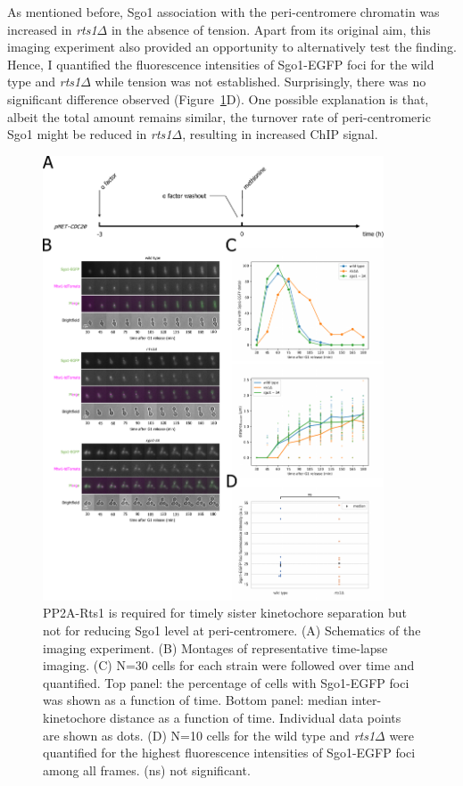 As mentioned before, Sgo1 association with the peri-centromere chromatin was increased in \textit{rts1$\Delta$} in the absence of tension. Apart from its original aim, this imaging experiment also provided an opportunity to alternatively test the finding. Hence, I quantified the fluorescence intensities of Sgo1-EGFP foci for the wild type and \textit{rts1$\Delta$} while tension was not established. Surprisingly, there was no significant difference observed (Figure~\ref{fig:sgo1rts1mutants}D). One possible explanation is that, albeit the total amount remains similar, the turnover rate of peri-centromeric Sgo1 might be reduced in \textit{rts1$\Delta$}, resulting in increased ChIP signal. 

\begin{figure}[htbp]
  \centering
  \includegraphics[width=0.9\textwidth]{chapter3/figures/Sgo1 rts1 mutants.pdf}
  \caption[PP2A-Rts1 is required for timely sister kinetochore separation but not for reducing Sgo1 level at peri-centromere]{PP2A-Rts1 is required for timely sister kinetochore separation but not for reducing Sgo1 level at peri-centromere. (A) Schematics of the imaging experiment. (B) Montages of representative time-lapse imaging. (C) N=30 cells for each strain were followed over time and quantified. Top panel: the percentage of cells with Sgo1-EGFP foci was shown as a function of time. Bottom panel: median inter-kinetochore distance as a function of time. Individual data points are shown as dots. (D) N=10 cells for the wild type and \textit{rts1$\Delta$} were quantified for the highest fluorescence intensities of Sgo1-EGFP foci among all frames. (ns) not significant.}
  \label{fig:sgo1rts1mutants}
\end{figure}

